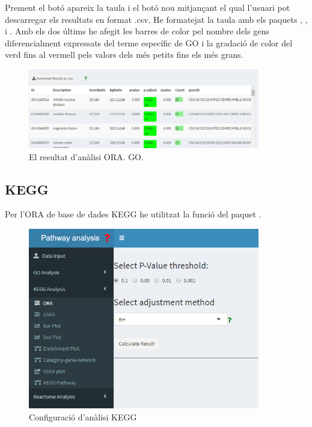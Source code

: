 Prement el botó apareix la taula i el botó nou mitjançant el qual l'usuari pot descarregar els resultats en format .csv. He formatejat la taula amb els paquets , ,  i . Amb els dos últims he afegit les barres de color pel nombre dels gens diferencialment expressats del terme específic de \gls{GO} i la gradació de color del verd fins al vermell pels valors dels més petits fins els més grans. 

\begin{figure}[h!]
\centering
\includegraphics[width=0.9\textwidth]{figures/App_F6_Items_GO_ORA_Table.png} 
\caption{El resultat d'anàlisi \gls{ORA}. \gls{GO}.}
\end{figure}


\subsection{\gls{KEGG}}

Per l'ORA de base de dades \gls{KEGG} he utilitzat la funció  del paquet . 



\begin{figure}[H]
\centering
\includegraphics[width=0.9\textwidth]{figures/App_F7_Items_KEGG_ORA.png} 
\caption{Configuració d'anàlisi \gls{KEGG}}
\end{figure}



